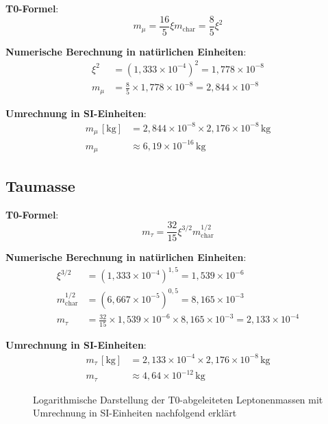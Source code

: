 \documentclass[12pt,a4paper]{article}
\newcommand{\xipar}{\xi}
\newcommand{\mchar}{m_{\text{char}}}
\begin{document}
\textbf{T0-Formel}:
\begin{equation}
	m_\mu = \frac{16}{5} \xipar \mchar = \frac{8}{5} \xipar^2
\end{equation}

\textbf{Numerische Berechnung in natürlichen Einheiten}:
\begin{align}
	\xipar^2 &= (1{,}333 \times 10^{-4})^2 = 1{,}778 \times 10^{-8} \\
	m_\mu &= \frac{8}{5} \times 1{,}778 \times 10^{-8} = 2{,}844 \times 10^{-8}
\end{align}

\textbf{Umrechnung in SI-Einheiten}:
\begin{align}
	m_\mu \,[\text{kg}] &= 2{,}844 \times 10^{-8} \times 2{,}176 \times 10^{-8}\,\text{kg} \\
	m_\mu &\approx 6{,}19 \times 10^{-16}\,\text{kg}
\end{align}

\subsection{Taumasse}

\textbf{T0-Formel}:
\begin{equation}
	m_\tau = \frac{32}{15} \xipar^{3/2} \mchar^{1/2}
\end{equation}

\textbf{Numerische Berechnung in natürlichen Einheiten}:
\begin{align}
	\xipar^{3/2} &= (1{,}333 \times 10^{-4})^{1{,}5} = 1{,}539 \times 10^{-6} \\
	\mchar^{1/2} &= (6{,}667 \times 10^{-5})^{0{,}5} = 8{,}165 \times 10^{-3} \\
	m_\tau &= \frac{32}{15} \times 1{,}539 \times 10^{-6} \times 8{,}165 \times 10^{-3} = 2{,}133 \times 10^{-4}
\end{align}

\textbf{Umrechnung in SI-Einheiten}:
\begin{align}
	m_\tau \,[\text{kg}] &= 2{,}133 \times 10^{-4} \times 2{,}176 \times 10^{-8}\,\text{kg} \\
	m_\tau &\approx 4{,}64 \times 10^{-12}\,\text{kg}
\end{align}

\begin{figure}[H]
	\centering
	\caption{Logarithmische Darstellung der T0-abgeleiteten Leptonenmassen mit Umrechnung in SI-Einheiten nachfolgend erklärt}
\end{figure}
\end{document}
